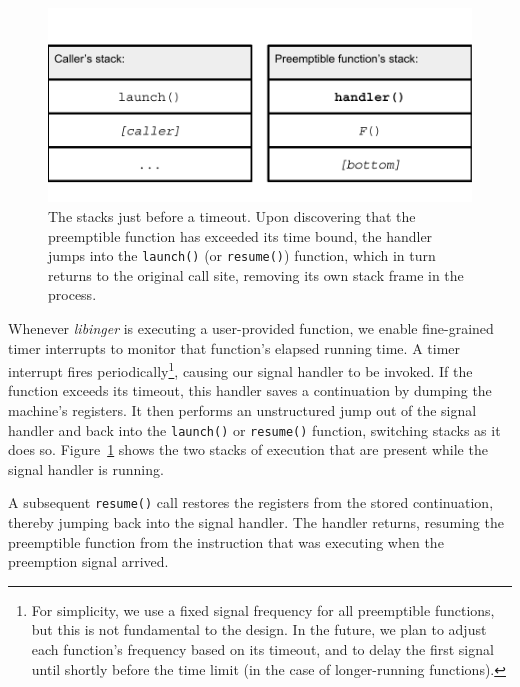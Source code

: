 \begin{figure}
\includegraphics[width=\columnwidth]{figs/twostacks}
\caption{The stacks just before a timeout.  \textnormal{Upon discovering
that the preemptible function has exceeded its time bound, the handler jumps into the
\texttt{launch()} (or \texttt{resume()}) function, which in turn returns to the
original call site, removing its own stack frame in the process.}}
\label{fig:twostacks}
\end{figure}

Whenever \textit{libinger} is executing a user-provided function, we
enable fine-grained timer interrupts to
monitor that function's elapsed running time.  A timer interrupt fires
periodically\footnote{For simplicity, we use a fixed signal frequency for all
preemptible functions, but this is not fundamental to the design.  In the future,
we plan to adjust each function's frequency based on its timeout, and to delay the
first signal until shortly before the time limit (in the case of longer-running
functions).}, causing our signal
handler to be invoked.  If the function exceeds its timeout,
this handler saves a continuation by dumping the machine's registers.  It then
performs an unstructured jump out of the signal handler and back into the
\texttt{launch()} or \texttt{resume()} function, switching stacks as it does so.
Figure~\ref{fig:twostacks} shows the two stacks of execution
that are present while the
signal handler is running.

A subsequent \texttt{resume()} call restores the registers from the stored
continuation, thereby jumping back into the signal handler.  The handler
returns, resuming the preemptible function from the instruction that was executing
when the preemption signal arrived.





